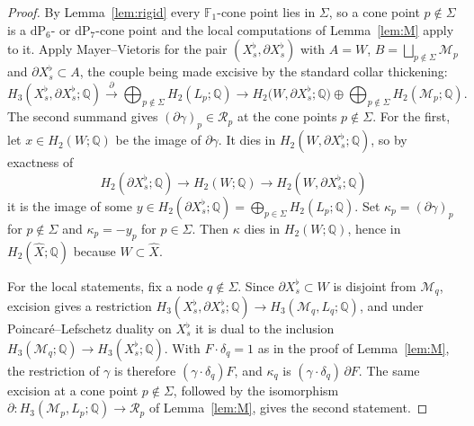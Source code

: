 \documentclass[11pt]{amsart}
\theoremstyle{definition}
\theoremstyle{remark}
\theoremstyle{plain}
\newcommand{\QQ}{\mathbb{Q}}
\newcommand{\Rsm}{\mathcal{R}}   %
\newcommand{\Mil}{\mathcal{M}}  %
\newcommand{\dP}{\mathrm{dP}}
\newcommand{\Xh}{\widehat{X}}
\begin{document}
\begin{proof}
By Lemma~\ref{lem:rigid} every $\mathbb F_1$-cone point lies in
$\Sigma$, so a cone point $p\notin\Sigma$ is a $\dP_6$- or
$\dP_7$-cone point and the local computations of Lemma~\ref{lem:M}
apply to it.  Apply Mayer--Vietoris for the pair
$(X_s^{\flat},\partial X_s^{\flat})$ with $A=W$,
$B=\bigsqcup_{p\notin\Sigma}\Mil_p$ and
$\partial X_s^{\flat}\subset A$, the couple being made excisive by the
standard collar thickening:
\[
H_3(X_s^{\flat},\partial X_s^{\flat};\QQ)
\xrightarrow{\ \partial\ }
\bigoplus_{p\notin\Sigma}H_2(L_p;\QQ)
\longrightarrow
H_2\bigl(W,\partial X_s^{\flat};\QQ\bigr)\oplus
\bigoplus_{p\notin\Sigma}H_2(\Mil_p;\QQ).
\]
The second summand gives $(\partial\gamma)_p\in \Rsm_p$ at the cone
points $p\notin\Sigma$.  For the first, let $x\in H_2(W;\QQ)$ be the
image of $\partial\gamma$.  It dies in
$H_2(W,\partial X_s^{\flat};\QQ)$, so by exactness of
\[
H_2(\partial X_s^{\flat};\QQ)\longrightarrow H_2(W;\QQ)
\longrightarrow H_2(W,\partial X_s^{\flat};\QQ)
\]
it is the image of some
$y\in H_2(\partial X_s^{\flat};\QQ)=
\bigoplus_{p\in\Sigma}H_2(L_p;\QQ)$.  Set
$\kappa_p=(\partial\gamma)_p$ for $p\notin\Sigma$ and
$\kappa_p=-y_p$ for $p\in\Sigma$.  Then $\kappa$ dies in $H_2(W;\QQ)$,
hence in $H_2(\Xh;\QQ)$ because $W\subset\Xh$.

For the local statements, fix a node $q\notin\Sigma$.  Since
$\partial X_s^{\flat}\subset W$ is disjoint from $\Mil_q$, excision gives
a restriction
$H_3(X_s^{\flat},\partial X_s^{\flat};\QQ)\to
H_3(\Mil_q,L_q;\QQ)$, and under Poincar\'e--Lefschetz duality on
$X_s^{\flat}$ it is dual to the inclusion
$H_3(\Mil_q;\QQ)\to H_3(X_s^{\flat};\QQ)$.  With $F\cdot\delta_q=1$ as in
the proof of Lemma~\ref{lem:M}, the restriction of $\gamma$ is
therefore $(\gamma\cdot\delta_q)F$, and $\kappa_q$ is
$(\gamma\cdot\delta_q)\,\partial F$.  The same excision at a cone
point $p\notin\Sigma$, followed by the isomorphism
$\partial\colon H_3(\Mil_p,L_p;\QQ)\to \Rsm_p$ of Lemma~\ref{lem:M},
gives the second statement.
\end{proof}
\end{document}
